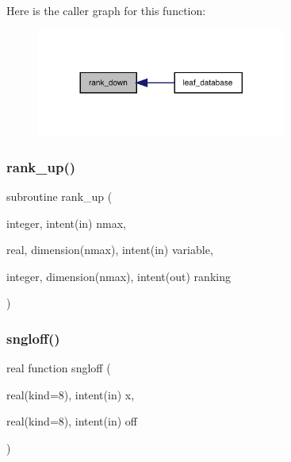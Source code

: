 Here is the caller graph for this function\+:
\nopagebreak
\begin{figure}[H]
\begin{center}
\leavevmode
\includegraphics[width=233pt]{numutils_8f90_ad368a70da00278adffefa8d34a5f87c6_icgraph}
\end{center}
\end{figure}
\mbox{\label{numutils_8f90_a0084ebfe86806971df228c1a4ef3ffbf}} 
\subsubsection{\texorpdfstring{rank\+\_\+up()}{rank\_up()}}
{\footnotesize\ttfamily subroutine rank\+\_\+up (\begin{DoxyParamCaption}\item[{integer, intent(in)}]{nmax,  }\item[{real, dimension(nmax), intent(in)}]{variable,  }\item[{integer, dimension(nmax), intent(out)}]{ranking }\end{DoxyParamCaption})}

\mbox{\label{numutils_8f90_a97ff3973394dba1b9534e055e358de97}} 
\subsubsection{\texorpdfstring{sngloff()}{sngloff()}}
{\footnotesize\ttfamily real function sngloff (\begin{DoxyParamCaption}\item[{real(kind=8), intent(in)}]{x,  }\item[{real(kind=8), intent(in)}]{off }\end{DoxyParamCaption})}

\mbox{\label{numutils_8f90_a0ce70697995bdbb28ca0f7de92ba5210}} 
